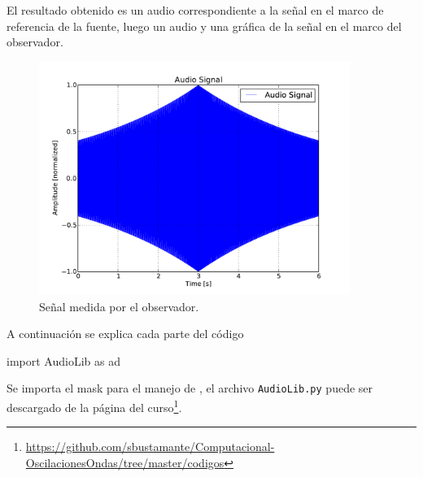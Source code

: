 El resultado obtenido es un audio correspondiente a la señal en el marco de
referencia de la fuente, luego un audio y una gráfica de la señal en el 
marco del observador.


\begin{figure}[htbp]
	\centering
	\includegraphics[width=0.90\textwidth]
	{./pictures/demo3_02.pdf}

	\caption{\small{Señal medida por el observador.}}
	
	\label{fig:doppler_audio}
\end{figure}


A continuación se explica cada parte del código


\begin{listing}[style=python, numbers = none]
import AudioLib as ad
\end{listing}
Se importa el mask para el manejo de \pyaudio, el archivo \texttt{AudioLib.py}
puede ser descargado de la página del curso\footnote{\url{https://github.com/sbustamante/Computacional-OscilacionesOndas/tree/master/codigos}}.

